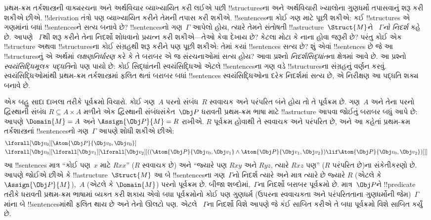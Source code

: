\documentclass[../../../include/open-logic-section]{subfiles}
\begin{document}


પ્રથમ-ક્રમ તર્કશાસ્ત્રની વાક્યરચના અને અર્થવિચાર વ્યાખ્યાયિત કરી લઈએ
પછી !!{structure}sના અને અર્થવિચારી ખ્યાલોના ગુણધર્મો તપાસવાનું શરૂ
કરી શકીએ છીએ. !!{derivation} તંત્રો પણ વ્યાખ્યાયિત કરીને તેમની તપાસ
કરી શકીએ. !!{sentence}sના કોઈ ગણ માટે પૂછી શકીએ: કઈ
!!{structure}s એ ગણમાંનાં બધાં !!{sentence}sને સત્ય બનાવે છે?
!!{sentence}sનો ગણ~$\Gamma$ આપેલો હોય, ત્યારે તેમને સંતોષતી
!!a{structure}~$\Struct{M}$ને \emph{~$\Gamma$નો નિદર્શ} કહે છે. આપણે
~$\Gamma$થી શરૂ કરીને તેના નિદર્શો શોધવાનો પ્રયત્ન કરી શકીએ---તેઓ
કેવા દેખાય છે? કેટલા મોટા કે નાના હોવા જરૂરી છે? પરંતુ કોઈ એક
!!{structure} અથવા !!{structure}sના કોઈ સંગ્રહથી શરૂ કરીને પણ પૂછી
શકીએ: તેમાં કયાં !!{sentence}s સત્ય છે? શું એવાં !!{sentence}s છે જે
આ !!{structure}sનું એ અર્થમાં \emph{લક્ષણનિર્ધારણ} કરે કે તે બરાબર
એ જ સંરચનાઓમાં સત્ય હોય? આવા પ્રશ્નો \emph{નિદર્શસિદ્ધાંત}ના ક્ષેત્રમાં
આવે છે. આ પ્રશ્નો \emph{સ્વયંસિદ્ધિમૂલક પદ્ધતિ}નો પણ પાયો છે: કોઈ
સિદ્ધાંતની સ્વયંસિદ્ધિઓ એટલે !!{sentence}sના ગણ વડે
!!{structure}sના સંગ્રહનું વર્ણન કરવું. સ્વયંસિદ્ધિઓમાંથી પ્રથમ-ક્રમ
તર્કશાસ્ત્રમાં ફલિત થતાં બરાબર બધાં !!{sentence}s સ્વયંસિદ્ધિઓના
દરેક નિદર્શમાં સત્ય છે, એ નિરીક્ષણ આ પદ્ધતિ શક્ય બનાવે છે.

એક બહુ સાદા દાખલા તરીકે પૂર્વક્રમો વિચારો. કોઈ ગણ~$A$ પરનો સંબંધ~$R$
સ્વવાચક અને પરંપરિત બંને હોય તો તે પૂર્વક્રમ છે. ગણ~$A$ અને તેના
પરનો દ્વિસ્થાની સંબંધ $R \subseteq A \times A$ મળીને એક દ્વિસ્થાની
સંબંધસંકેત~$\Obj P$ ધરાવતી પ્રથમ-ક્રમ ભાષા માટે !!a{structure} આપવા
જોઈતું બરાબર બધું આપે છે: આપણે $\Domain{M} = A$ અને
$\Assign{\Obj P}{M} = R$ રાખીએ. $R$ પૂર્વક્રમ હોવાથી તે સ્વવાચક અને
પરંપરિત છે, અને આ કહેતાં પ્રથમ-ક્રમ તર્કશાસ્ત્રનાં !!{sentence}sનો
ગણ~$\Gamma$ આપણે શોધી શકીએ છીએ:
\begin{align*}
  & \lforall[\Obj v_0][\Atom{\Obj P}{\Obj v_0,\Obj v_0}]\\
  & \lforall[\Obj v_0][\lforall[\Obj v_1][\lforall[\Obj v_2][((\Atom{\Obj P}{\Obj v_0,\Obj v_1} \land \Atom{\Obj P}{\Obj v_1,\Obj v_2}) \lif \Atom{\Obj P}{\Obj v_0,\Obj v_2})]]]
\end{align*}
આ !!{sentence}s માત્ર ``કોઈ પણ~$x$ માટે $Rxx$'' ($R$ સ્વવાચક છે) અને
``જ્યારે પણ $Rxy$ અને $Ryz$, ત્યારે $Rxz$ પણ'' ($R$ પરંપરિત છે)ના
સંકેતીકરણો છે. આપણે જોઈએ છીએ કે !!a{structure}~$\Struct{M}$ આ બે
!!{sentence}sના ગણ~$\Gamma$નો નિદર્શ ત્યારે અને માત્ર ત્યારે છે
જ્યારે $R$ (એટલે કે~$\Assign{\Obj P}{M}$),~$A$ (એટલે કે
$\Domain{M}$) પરનો પૂર્વક્રમ છે. બીજા શબ્દોમાં,~$\Gamma$ના નિદર્શો
બરાબર પૂર્વક્રમો છે. માત્ર~$\Obj P$ને !!{predicate} તરીકે ધરાવતી
પ્રથમ-ક્રમ ભાષામાં વ્યક્ત કરી શકાય એવો બધા પૂર્વક્રમોનો કોઈ પણ
ગુણધર્મ (ઉપરના સ્વવાચકતા અને પરંપરિતતાના ગુણધર્મોની જેમ)~$\Gamma$માંના
બે !!{sentence}sમાંથી ફલિત થાય છે અને તેનો ઊલટો પણ. એટલે
~$\Gamma$ના નિદર્શો વિશે આપણે જે કંઈ સાબિત કરીએ તે બધા પૂર્વક્રમો
વિશે સાબિત કર્યું છે.
\end{document}
